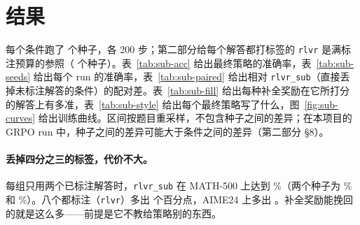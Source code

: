 
\section{结果}\label{sec:res}

每个条件跑了  个种子，各 200 步；第二部分给每个解答都打标签的 \texttt{rlvr} 是满标注预算的参照（ 个种子）。表~\ref{tab:sub-acc} 给出最终策略的准确率，表~\ref{tab:sub-seeds} 给出每个 run 的准确率，表~\ref{tab:sub-paired} 给出相对 \texttt{rlvr\_sub}（直接丢掉未标注解答的条件）的配对差。表~\ref{tab:sub-fill} 给出每种补全奖励在它所打分的解答上有多准，表~\ref{tab:sub-style} 给出每个最终策略写了什么，图~\ref{fig:sub-curves} 给出训练曲线。区间按题目重采样，不包含种子之间的差异；在本项目的 GRPO run 中，种子之间的差异可能大于条件之间的差异（第二部分 \S8）。

\begin{table}[t]
\centering\small

\caption{最终策略：准确率（\%），种子均值 $\pm$ 种子间标准差。MATH-500 和 GSM8K：贪心解码。AMC23、AIME24 和 AIME25：温度 0.6 下每题 16 个样本的平均。\texttt{rlvr}：每个解答都打标签（第二部分）；其他条件每组 8 个解答只标注 2 个。}
\label{tab:sub-acc}
\end{table}

\begin{table}[t]
\centering\small

\caption{每个 run 的最终策略：准确率（\%），口径同表~\ref{tab:sub-acc}。}
\label{tab:sub-seeds}
\end{table}

\paragraph{丢掉四分之三的标签，代价不大。} 每组只用两个已标注解答时，\texttt{rlvr\_sub} 在 MATH-500 上达到 \%（两个种子为 \% 和 \%）。八个都标注（\texttt{rlvr}）多出   个百分点，AIME24 上多出  。补全奖励能挽回的就是这么多——前提是它不教给策略别的东西。

\begin{table}[t]
\centering\small

\caption{相对 \texttt{rlvr\_sub} 的配对差（百分点）：逐题取各条件的种子均值之差，再对题目取平均，附按题目自助法得到的 95\% 区间。}
\label{tab:sub-paired}
\end{table}

